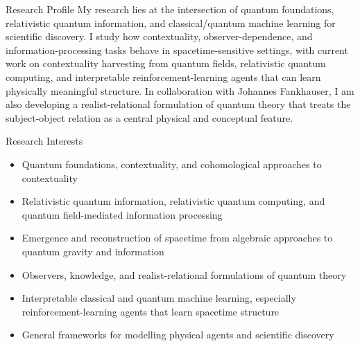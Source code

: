 \documentclass{resume} %
\begin{document}

\begin{rSection}{Research Profile}
My research lies at the intersection of quantum foundations, relativistic quantum information, and classical/quantum machine learning for scientific discovery. I study how contextuality, observer-dependence, and information-processing tasks behave in spacetime-sensitive settings, with current work on contextuality harvesting from quantum fields, relativistic quantum computing, and interpretable reinforcement-learning agents that can learn physically meaningful structure. In collaboration with Johannes Fankhauser, I am also developing a realist-relational formulation of quantum theory that treats the subject-object relation as a central physical and conceptual feature.
\end{rSection}

\vspace{1em}

\begin{rSection}{Research Interests}
\begin{itemize}
\item Quantum foundations, contextuality, and cohomological approaches to contextuality
\item Relativistic quantum information, relativistic quantum computing, and quantum field-mediated information processing
\item Emergence and reconstruction of spacetime from algebraic approaches to quantum gravity and information
\item Observers, knowledge, and realist-relational formulations of quantum theory
\item Interpretable classical and quantum machine learning, especially reinforcement-learning agents that learn spacetime structure
\item General frameworks for modelling physical agents and scientific discovery
\end{itemize}
\end{rSection}

\vspace{1em}
\end{document}
